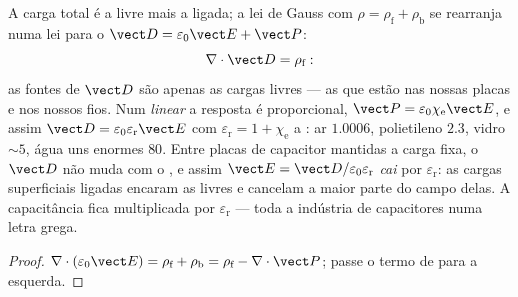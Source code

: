 \begin{proposition}\label{prop:b3:electromagnetism-in-matter:displacement}
A carga total é a livre mais a ligada; a lei de Gauss com $\rho =
\rho_{\text{f}} + \rho_{\text{b}}$ se rearranja numa lei para o
\emph{} $\vect D = \varepsilon_0\vect E +
\vect P$:
\[
\nabla\cdot\vect D = \rho_{\text{f}} :
\]
as fontes de $\vect D$ são apenas as cargas livres --- as que estão nas
nossas placas e nos nossos fios. Num  \emph{linear} a resposta é
proporcional, $\vect P = \varepsilon_0\chi_{\text{e}}\vect E$, e assim
$\vect D = \varepsilon_0\varepsilon_{\text{r}}\vect E$ com
$\varepsilon_{\text{r}} = 1 + \chi_{\text{e}}$ a \emph{}: ar $1.0006$, polietileno $2.3$, vidro $\sim 5$,
água uns enormes $80$. Entre placas de capacitor mantidas a carga
fixa, o $\vect D$ não muda com o , e assim $\vect E =
\vect D/\varepsilon_0\varepsilon_{\text{r}}$ \emph{cai} por
$\varepsilon_{\text{r}}$: as cargas superficiais ligadas encaram as
livres e cancelam a maior parte do campo delas. A capacitância fica
multiplicada por $\varepsilon_{\text{r}}$ --- toda a indústria de
capacitores numa letra grega.
\end{proposition}

\begin{proof}
$\nabla\cdot(\varepsilon_0\vect E) = \rho_{\text{f}} +
\rho_{\text{b}} = \rho_{\text{f}} - \nabla\cdot\vect P$; passe o
termo de  para a esquerda.
\end{proof}

